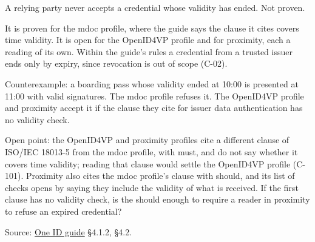 \begin{theorem}
  \label{thm:g04}
  A relying party never accepts a credential whose validity has ended.  Not
  proven.

  It is proven for the mdoc profile, where the guide says the clause it cites
  covers time validity.  It is open for the OpenID4VP profile and for
  proximity, each a reading of its own.  Within the guide's rules a credential from a trusted issuer
  ends only by expiry, since revocation is out of scope (C-02).

  Counterexample: a boarding pass whose validity ended at 10:00 is presented
  at 11:00 with valid signatures.  The mdoc profile refuses it.  The OpenID4VP
  profile and proximity accept it if the clause they cite for issuer data
  authentication has no validity check.

  Open point: the OpenID4VP and proximity profiles cite a different clause of
  ISO/IEC 18013-5 from the mdoc profile, with must, and do not say whether it
  covers time validity; reading that clause would settle the OpenID4VP profile
  (C-101).  Proximity also cites the mdoc profile's clause with should, and
  its list of checks opens by saying they include the validity of what is
  received.  If the first clause has no validity check, is the should enough
  to require a reader in proximity to refuse an expired credential?

  Source:
  \href{https://standards.atlassian.net/wiki/spaces/OneID/pages/2947416082/Technical+Implementation+Guide}{One ID guide} §4.1.2, §4.2.
\end{theorem}
